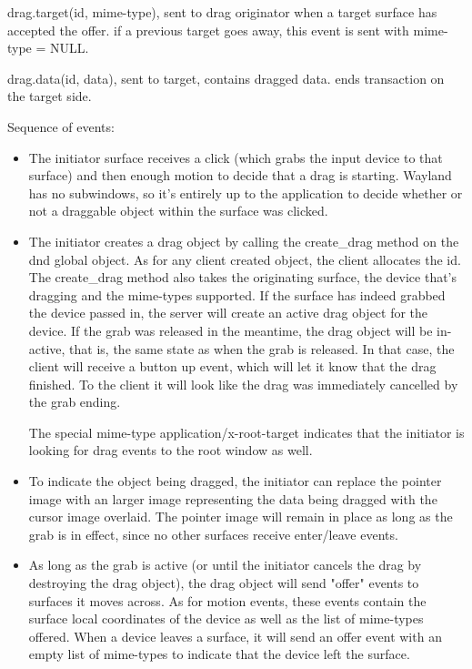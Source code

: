 \documentclass{article}
\begin{document}
	drag.target(id, mime-type), sent to drag originator when a
	target surface has accepted the offer. if a previous target
	goes away, this event is sent with mime-type = NULL.

	drag.data(id, data), sent to target, contains dragged data.
	ends transaction on the target side.

Sequence of events:

\begin{itemize}
\item The initiator surface receives a click (which grabs the input
  device to that surface) and then enough motion to decide that a drag
  is starting.  Wayland has no subwindows, so it's entirely up to the
  application to decide whether or not a draggable object within the
  surface was clicked.

\item The initiator creates a drag object by calling the create\_drag
  method on the dnd global object.  As for any client created object,
  the client allocates the id.  The create\_drag method also takes the
  originating surface, the device that's dragging and the mime-types
  supported.  If the surface has indeed grabbed the device passed in,
  the server will create an active drag object for the device.  If the
  grab was released in the meantime, the drag object will be
  in-active, that is, the same state as when the grab is released.  In
  that case, the client will receive a button up event, which will let
  it know that the drag finished.  To the client it will look like the
  drag was immediately cancelled by the grab ending.

  The special mime-type application/x-root-target indicates that the
  initiator is looking for drag events to the root window as well.

\item To indicate the object being dragged, the initiator can replace
  the pointer image with an larger image representing the data being
  dragged with the cursor image overlaid.  The pointer image will
  remain in place as long as the grab is in effect, since no other
  surfaces receive enter/leave events.

\item As long as the grab is active (or until the initiator cancels
  the drag by destroying the drag object), the drag object will send
  "offer" events to surfaces it moves across. As for motion events,
  these events contain the surface local coordinates of the device as
  well as the list of mime-types offered.  When a device leaves a
  surface, it will send an offer event with an empty list of
  mime-types to indicate that the device left the surface.


\end{itemize}
\end{document}
